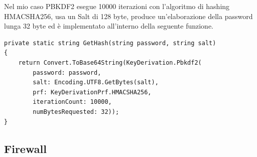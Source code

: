 \medskip
Nel mio caso PBKDF2 esegue 10000 iterazioni con l'algoritmo di hashing HMACSHA256, usa un Salt di 128 byte, produce un'elaborazione della password lunga 32 byte ed è implementato all'interno della seguente funzione. 
\smallskip

\begin{lstlisting}[style=csharp]
private static string GetHash(string password, string salt)
{
    return Convert.ToBase64String(KeyDerivation.Pbkdf2(
        password: password,
        salt: Encoding.UTF8.GetBytes(salt),
        prf: KeyDerivationPrf.HMACSHA256,
        iterationCount: 10000,
        numBytesRequested: 32));
}
\end{lstlisting}
\subsection{Firewall}
